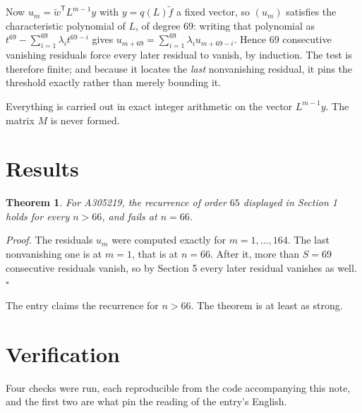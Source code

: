 \documentclass[11pt]{article}
\newtheorem{theorem}{Theorem}
\theoremstyle{definition}
\begin{document}
Now $u_m = \tilde w^{\mathsf T} L^{m-1} y$ with $y = q(L)\tilde f$ a fixed vector, so $(u_m)$ satisfies the characteristic polynomial of $L$, of degree $69$: writing that polynomial as $t^{69} - \sum_{i=1}^{69} \lambda_i t^{69-i}$ gives $u_{m+69} = \sum_{i=1}^{69} \lambda_i u_{m+69-i}$. Hence $69$ consecutive vanishing residuals force every later residual to vanish, by induction. The test is therefore finite; and because it locates the {\itshape last} nonvanishing residual, it pins the threshold exactly rather than merely bounding it.

Everything is carried out in exact integer arithmetic on the vector $L^{m-1}y$. The matrix $M$ is never formed.

\section{Results}

\begin{theorem} For A305219, the recurrence of order $65$ displayed in Section 1 holds for every $n > 66$, and fails at $n = 66$.\end{theorem}

{\itshape Proof.} The residuals $u_m$ were computed exactly for $m = 1,\dots,164$. The last nonvanishing one is at $m = 1$, that is at $n = 66$. After it, more than $S = 69$ consecutive residuals vanish, so by Section 5 every later residual vanishes as well. $\square$

The entry claims the recurrence for $n > 66$. The theorem is at least as strong.

\section{Verification}

Four checks were run, each reproducible from the code accompanying this note, and the first two are what pin the reading of the entry's English.
\end{document}
